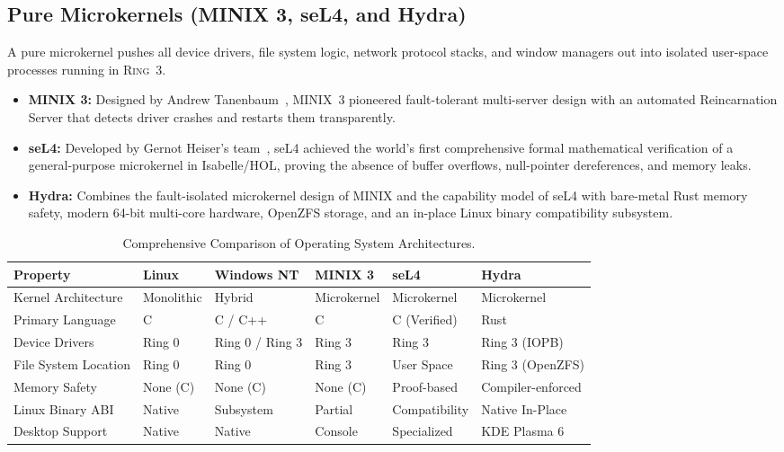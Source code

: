 \subsection{Pure Microkernels (MINIX 3, seL4, and Hydra)}
A pure microkernel pushes all device drivers, file system logic, network protocol stacks, and window managers out into isolated user-space processes running in \textsc{Ring~3}.
\begin{itemize}
    \item \textbf{MINIX 3:} Designed by Andrew Tanenbaum~\cite{tanenbaum2006operating}, MINIX~3 pioneered fault-tolerant multi-server design with an automated Reincarnation Server that detects driver crashes and restarts them transparently.
    \item \textbf{seL4:} Developed by Gernot Heiser's team~\cite{klein2009sel4}, seL4 achieved the world's first comprehensive formal mathematical verification of a general-purpose microkernel in Isabelle/HOL, proving the absence of buffer overflows, null-pointer dereferences, and memory leaks.
    \item \textbf{Hydra:} Combines the fault-isolated microkernel design of MINIX and the capability model of seL4 with bare-metal Rust memory safety, modern 64-bit multi-core hardware, OpenZFS storage, and an in-place Linux binary compatibility subsystem.
\end{itemize}

\begin{table}[htbp]
\centering
\small
\begin{tabularx}{\textwidth}{lXXXXX}
\toprule
\textbf{Property} & \textbf{Linux} & \textbf{Windows NT} & \textbf{MINIX 3} & \textbf{seL4} & \textbf{Hydra} \\
\midrule
Kernel Architecture & Monolithic & Hybrid & Microkernel & Microkernel & Microkernel \\
Primary Language & C & C / C++ & C & C (Verified) & Rust \\
Device Drivers & Ring 0 & Ring 0 / Ring 3 & Ring 3 & Ring 3 & Ring 3 (IOPB) \\
File System Location & Ring 0 & Ring 0 & Ring 3 & User Space & Ring 3 (OpenZFS) \\
Memory Safety & None (C) & None (C) & None (C) & Proof-based & Compiler-enforced \\
Linux Binary ABI & Native & Subsystem & Partial & Compatibility & Native In-Place \\
Desktop Support & Native & Native & Console & Specialized & KDE Plasma 6 \\
\bottomrule
\end{tabularx}
\caption{Comprehensive Comparison of Operating System Architectures.}
\label{tab:os_comparison}
\end{table}


